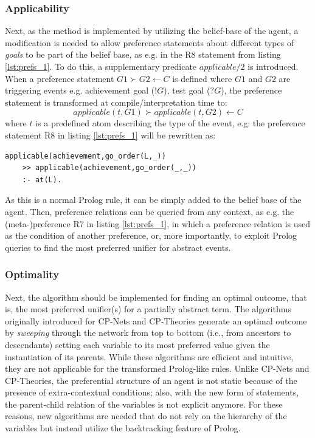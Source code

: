 \subsubsection*{Applicability} Next, as the method is implemented by utilizing the belief-base of the agent, a modification is needed to allow preference statements about different types of \textit{goals} to be part of the belief base, as e.g. in the R8 statement from listing \ref{lst:prefs_1}. To do this, a supplementary predicate $applicable/2$ is introduced. When a preference statement $G1 \succ G2 \leftarrow C$ is defined where $G1$ and $G2$ are triggering events e.g. achievement goal ($!G$), test goal ($?G$), the preference statement is transformed at compile/interpretation time to:
\begin{equation*}
applicable(t,G1) \succ applicable(t,G2) \leftarrow C
\end{equation*}
where $t$ is a predefined atom describing the type of the event, e.g: the preference statement R8 in listing \ref{lst:prefs_1} will be rewritten as:
\begin{verbatim}
applicable(achievement,go_order(L,_)) 
    >> applicable(achievement,go_order(_,_)) 
    :- at(L).
\end{verbatim}
As this is a normal Prolog rule, it can be simply added to the belief base of the agent. Then, preference relations can be queried from any context, as e.g. the (meta-)preference R7 in listing \ref{lst:prefs_1}, in which a preference relation is used as the condition of another preference, or, more importantly, to exploit Prolog queries to find the most preferred unifier for abstract events.

\subsubsection*{Optimality}
Next, the algorithm should be implemented for finding an optimal outcome, that is, the most preferred unifier(s) for a partially abstract term. The algorithms originally introduced for CP-Nets and CP-Theories generate an optimal outcome by \textit{sweeping} through the network from top to bottom (i.e., from ancestors to descendants) setting each variable to its most preferred value given the instantiation of its parents. While these algorithms are efficient and intuitive, they are not applicable for the transformed Prolog-like rules. Unlike CP-Nets and CP-Theories, the preferential structure of an agent is not static because of the presence of extra-contextual conditions; also, with the new form of statements, the parent-child relation of the variables is not explicit anymore. For these reasons, new algorithms are needed that do not rely on the hierarchy of the variables but instead utilize the backtracking feature of Prolog. 

